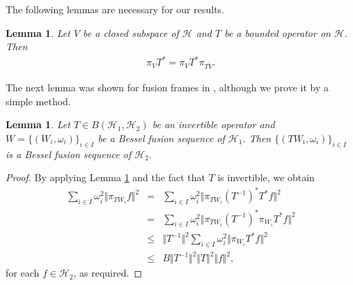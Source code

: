 \documentclass{birkjour}
\newtheorem{lem}[thm]{Lemma}
\newtheorem{prop}[thm]{Proposition}
\theoremstyle{definition}
\theoremstyle{remark}
\numberwithin{equation}{section}
\begin{document}
The following lemmas are necessary for our results.
\begin{lem}\cite{Cas08}\label{2.9}
Let $V$ be a closed subspace of $\mathcal{H}$ and $T$ be a bounded operator
on $\mathcal{H}$. Then \begin{eqnarray}
 \pi_{V}T^{*} = \pi_{V}T^{*}\pi_{\overline{TV}}.
 \end{eqnarray}
\end{lem}
The next  lemma  was shown for fusion frames in \cite{Ruiz}, although we prove it by a  simple  method.
\begin{lem}\label{invert4.}
Let $T\in B(\mathcal{H}_{1}, \mathcal{H}_{2})$ be an invertible operator and  $W=\lbrace (W_{i}, \omega_{i})\rbrace_{i\in I}$ be a Bessel fusion sequence of $\mathcal{H}_{1}$. Then   $\lbrace (TW_{i}, \omega_{i})\rbrace_{i\in I}$ is  a Bessel fusion sequence of $\mathcal{H}_{2}$.
\end{lem}
\begin{proof}
By applying  Lemma \ref{2.9} and the fact that $T$ is invertible, we obtain
\begin{eqnarray*}  \sum_{i\in I}\omega_{i}^{2}\Vert \pi_{TW_{i}}f \Vert^{2}&=&  \sum_{i\in I}\omega_{i}^{2}\Vert \pi_{TW_{i}}(T^{-1})^{*}T^{*}f\Vert^{2} \\
&=&\sum_{i\in I}\omega_{i}^{2}\Vert  \pi_{TW_{i}}(T^{-1})^{*}\pi_{W_{i}}T^{*}f\Vert^{2} \\
&\leq& \Vert T^{-1}\Vert^{2}\sum_{i\in I}\omega_{i}^{2}\Vert \pi_{W_{i}}T^{*}f \Vert^{2}\\
&\leq& B\Vert T^{-1}\Vert^{2} \Vert T\Vert^{2}\Vert f \Vert^{2},
 \end{eqnarray*}
for each $f\in \mathcal{H}_{2}$, as required.
\end{proof}


\end{document}

